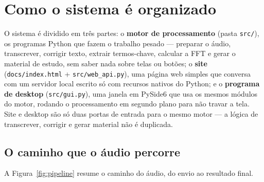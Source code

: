 \documentclass[11pt,a4paper]{article}
\begin{document}
\section{Como o sistema é organizado}

O sistema é dividido em três partes: o \textbf{motor de processamento} (pasta \texttt{src/}), os programas Python que fazem o trabalho pesado --- preparar o áudio, transcrever, corrigir texto, extrair termos-chave, calcular a FFT e gerar o material de estudo, sem saber nada sobre telas ou botões; o \textbf{site} (\texttt{docs/index.html} + \texttt{src/web\_api.py}), uma página web simples que conversa com um servidor local escrito só com recursos nativos do Python; e o \textbf{programa de desktop} (\texttt{src/gui.py}), uma janela em PySide6 que usa os mesmos módulos do motor, rodando o processamento em segundo plano para não travar a tela. Site e desktop são só duas portas de entrada para o mesmo motor --- a lógica de transcrever, corrigir e gerar material não é duplicada.

\subsection{O caminho que o áudio percorre}

A Figura~\ref{fig:pipeline} resume o caminho do áudio, do envio ao resultado final.
\end{document}
